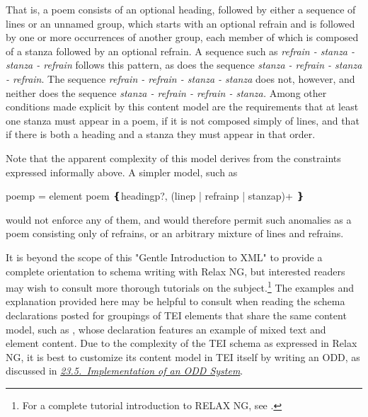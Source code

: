 \par\egroup 
 That is, a poem consists of an optional heading, followed by either a sequence of lines or an unnamed group, which starts with an optional refrain and is followed by one or more occurrences of another group, each member of which is composed of a stanza followed by an optional refrain. A sequence such as \textit{refrain - stanza - stanza - refrain} follows this pattern, as does the sequence \textit{stanza - refrain - stanza - refrain}. The sequence \textit{refrain - refrain - stanza - stanza} does not, however, and neither does the sequence \textit{stanza - refrain - refrain - stanza.} Among other conditions made explicit by this content model are the requirements that at least one stanza must appear in a poem, if it is not composed simply of lines, and that if there is both a heading and a stanza they must appear in that order.\par
Note that the apparent complexity of this model derives from the constraints expressed informally above. A simpler model, such as \par\hfill\bgroup\exampleFont\vskip 10pt\begin{shaded}
\obeyspaces poem\textunderscore p =\newline
element poem ❴heading\textunderscore p?, (line\textunderscore p | refrain\textunderscore p | stanza\textunderscore p)+ ❵\end{shaded}
\par\egroup 
 would not enforce any of them, and would therefore permit such anomalies as a poem consisting only of refrains, or an arbitrary mixture of lines and refrains.\par
It is beyond the scope of this "Gentle Introduction to XML" to provide a complete orientation to schema writing with Relax NG, but interested readers may wish to consult more thorough tutorials on the subject.\footnote{For a complete tutorial introduction to RELAX NG, see \cite{SG-BIBL-1}.} The examples and explanation provided here may be helpful to consult when reading the schema declarations posted for groupings of TEI elements that share the same content model, such as , whose declaration features an example of mixed text and element content. Due to the complexity of the TEI schema as expressed in Relax NG, it is best to customize its content model in TEI itself by writing an ODD, as discussed in \textit{\hyperref[IM]{23.5.\ Implementation of an ODD System}}.
